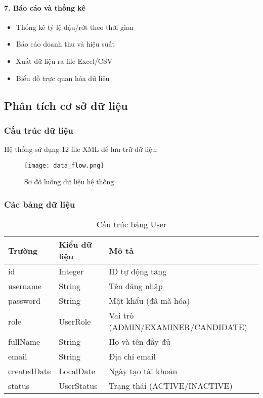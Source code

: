 \documentclass[12pt,a4paper]{article}
\begin{document}
\paragraph{7. Báo cáo và thống kê}
\begin{itemize}
    \item Thống kê tỷ lệ đậu/rớt theo thời gian
    \item Báo cáo doanh thu và hiệu suất
    \item Xuất dữ liệu ra file Excel/CSV
    \item Biểu đồ trực quan hóa dữ liệu
\end{itemize}

\subsection{Phân tích cơ sở dữ liệu}

\subsubsection{Cấu trúc dữ liệu}

Hệ thống sử dụng 12 file XML để lưu trữ dữ liệu:

\begin{figure}[H]
\centering
\texttt{[image: data\_flow.png]}
\caption{Sơ đồ luồng dữ liệu hệ thống}
\label{fig:data_flow}
\end{figure}

\subsubsection{Các bảng dữ liệu}

\begin{table}[H]
\centering
\caption{Cấu trúc bảng User}
\label{tab:user_structure}
\begin{tabular}{|l|l|l|}
\hline
\textbf{Trường} & \textbf{Kiểu dữ liệu} & \textbf{Mô tả} \\
\hline
id & Integer & ID tự động tăng \\
\hline
username & String & Tên đăng nhập \\
\hline
password & String & Mật khẩu (đã mã hóa) \\
\hline
role & UserRole & Vai trò (ADMIN/EXAMINER/CANDIDATE) \\
\hline
fullName & String & Họ và tên đầy đủ \\
\hline
email & String & Địa chỉ email \\
\hline
createdDate & LocalDate & Ngày tạo tài khoản \\
\hline
status & UserStatus & Trạng thái (ACTIVE/INACTIVE) \\
\hline
\end{tabular}
\end{table}
\end{document}
